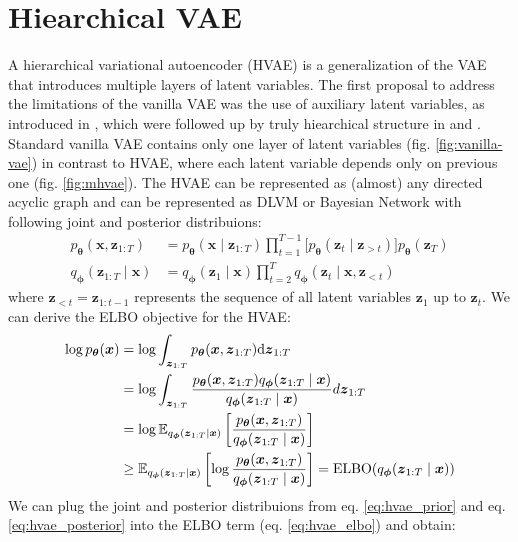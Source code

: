 \section{Hiearchical VAE}
A hierarchical variational autoencoder (HVAE) is a generalization of the VAE that introduces multiple layers of latent variables.
The first proposal to address the limitations of the vanilla VAE was the use of auxiliary latent variables, as introduced in \cite{aux-var-2016},
which were followed up by truly hiearchical structure in \cite{lvae-2016} and \cite{iaf-2016}. Standard vanilla VAE contains only one layer
of latent variables (fig. \ref{fig:vanilla-vae}) in contrast to HVAE, where each latent variable depends only on previous one
(fig. \ref{fig:mhvae}). The HVAE can be represented as (almost) any directed acyclic graph and can be represented as DLVM or Bayesian Network with 
following joint and posterior distribuions:
\begin{align}
    p_{\boldsymbol{\theta}}(\boldsymbol{x},\boldsymbol{z}_{1:T})&=p_{\boldsymbol{\theta}}(\boldsymbol{x}\mid\boldsymbol{z}_{1:T}) \prod_{t=1}^{T-1}\bigl[p_{\boldsymbol{\theta}}(\boldsymbol{z}_{t}\mid\boldsymbol{z}_{>t}) \bigr]  p_{\boldsymbol{\theta}}(\boldsymbol{z}_{T}) \label{eq:hvae_prior} \\
    q_{\boldsymbol{\phi}}(\boldsymbol{z}_{1:T}\mid\boldsymbol{x}) &= q_{\boldsymbol{\phi}}(\boldsymbol{z}_{1}\mid\boldsymbol{x}) \prod_{t=2}^{T}  q_{\boldsymbol{\phi}}(\boldsymbol{z}_{t}\mid \boldsymbol{x},\boldsymbol{z}_{<t}) \label{eq:hvae_posterior}
\end{align}
where $\boldsymbol{z}_{<t} = \boldsymbol{z}_{1:t-1}$ represents the sequence of all latent variables $\boldsymbol{z}_1$ up to $\boldsymbol{z}_t$. 
We can derive the ELBO objective for the HVAE: 
\begin{align}
    \log p_{\boldsymbol{\theta}}(\boldsymbol{x}) &= \log \int_{\boldsymbol{z}_{1:T}} p_{\boldsymbol{\theta}}(\boldsymbol{x},\boldsymbol{z}_{1:T}) \mbox{\rm d}\boldsymbol{z}_{1:T} \notag\\
    &= \log \int_{\boldsymbol{z}_{1:T}} \frac{p_{\boldsymbol{\theta}}(\boldsymbol{x}, \boldsymbol{z}_{1:T})q_{\boldsymbol{\phi}}(\boldsymbol{z}_{1:T}\mid \boldsymbol{x})}{q_{\boldsymbol{\phi}}(\boldsymbol{z}_{1:T}\mid\boldsymbol{x})} d\boldsymbol{z}_{1:T} \notag \\
    &= \log \operatorname{\mathbb{E}}_{q_{\boldsymbol{\phi}}(\boldsymbol{z}_{1:T}\mid\boldsymbol{x})} \left[\frac{p_{\boldsymbol{\theta}}(\boldsymbol{x}, \boldsymbol{z}_{1:T})}{q_{\boldsymbol{\phi}}(\boldsymbol{z}_{1:T}\mid\boldsymbol{x})}\right] \notag\\
    &\geq \mathbb{E}_{q_{\boldsymbol{\phi}}(\boldsymbol{z}_{1:T}\mid\boldsymbol{x})}\left[\log \frac{p_{\boldsymbol{\theta}}(\boldsymbol{x}, \boldsymbol{z}_{1:T})}{q_{\boldsymbol{\phi}}(\boldsymbol{z}_{1:T}\mid\boldsymbol{x})}\right]  = \mathrm{ELBO}(q_{\boldsymbol{\phi}}(\boldsymbol{z}_{1:T}\mid\boldsymbol{x})) \label{eq:hvae_elbo}
\end{align}
We can plug the joint and posterior distribuions from eq. \ref{eq:hvae_prior} and  eq. \ref{eq:hvae_posterior} into the ELBO term (eq. \ref{eq:hvae_elbo}) and obtain:

